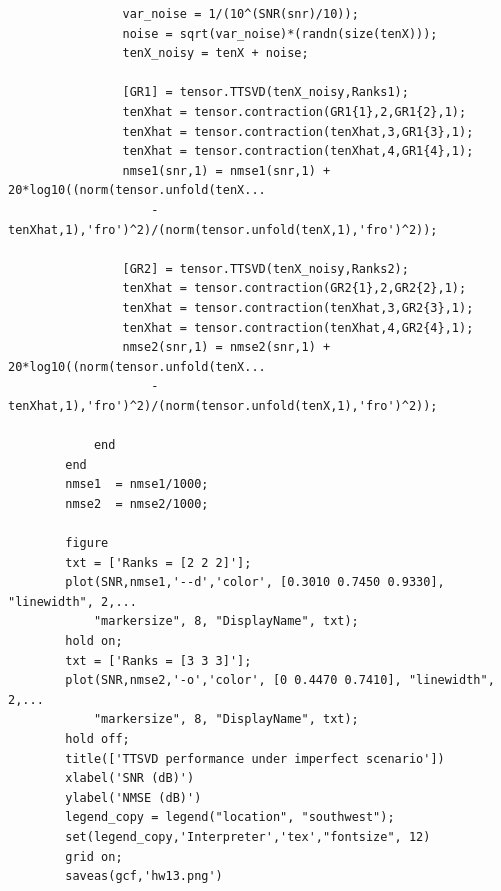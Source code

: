 \documentclass[a4paper,10pt]{article}
\begin{document}
\begin{verbatim}
                var_noise = 1/(10^(SNR(snr)/10));
                noise = sqrt(var_noise)*(randn(size(tenX)));
                tenX_noisy = tenX + noise;
                
                [GR1] = tensor.TTSVD(tenX_noisy,Ranks1);
                tenXhat = tensor.contraction(GR1{1},2,GR1{2},1);
                tenXhat = tensor.contraction(tenXhat,3,GR1{3},1);
                tenXhat = tensor.contraction(tenXhat,4,GR1{4},1);
                nmse1(snr,1) = nmse1(snr,1) + 20*log10((norm(tensor.unfold(tenX...
                    - tenXhat,1),'fro')^2)/(norm(tensor.unfold(tenX,1),'fro')^2));
                
                [GR2] = tensor.TTSVD(tenX_noisy,Ranks2);
                tenXhat = tensor.contraction(GR2{1},2,GR2{2},1);
                tenXhat = tensor.contraction(tenXhat,3,GR2{3},1);
                tenXhat = tensor.contraction(tenXhat,4,GR2{4},1);
                nmse2(snr,1) = nmse2(snr,1) + 20*log10((norm(tensor.unfold(tenX... 
                    - tenXhat,1),'fro')^2)/(norm(tensor.unfold(tenX,1),'fro')^2));
                
            end
        end
        nmse1  = nmse1/1000;
        nmse2  = nmse2/1000;

        figure
        txt = ['Ranks = [2 2 2]'];
        plot(SNR,nmse1,'--d','color', [0.3010 0.7450 0.9330], "linewidth", 2,...
            "markersize", 8, "DisplayName", txt);
        hold on;
        txt = ['Ranks = [3 3 3]'];
        plot(SNR,nmse2,'-o','color', [0 0.4470 0.7410], "linewidth", 2,...
            "markersize", 8, "DisplayName", txt);
        hold off;
        title(['TTSVD performance under imperfect scenario'])
        xlabel('SNR (dB)')
        ylabel('NMSE (dB)')
        legend_copy = legend("location", "southwest");
        set(legend_copy,'Interpreter','tex',"fontsize", 12)
        grid on;
        saveas(gcf,'hw13.png')
    \end{verbatim}
    
%
%
\end{document}
